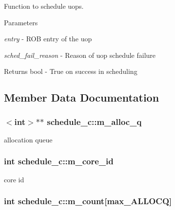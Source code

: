 Function to schedule uops. 


\begin{DoxyParams}{Parameters}
\item[{\em entry}]-\/ ROB entry of the uop \item[{\em sched\_\-fail\_\-reason}]-\/ Reason of uop schedule failure \end{DoxyParams}
\begin{DoxyReturn}{Returns}
bool -\/ True on success in scheduling 
\end{DoxyReturn}


\subsection{Member Data Documentation}
\hypertarget{classschedule__c_a54abfd4e67cf5e137e5f47ce52e8d903}{
\subsubsection[{m\_\-alloc\_\-q}]{$<$int$>$$\ast$$\ast$ {\bf schedule\_\-c::m\_\-alloc\_\-q}}}
\label{classschedule__c_a54abfd4e67cf5e137e5f47ce52e8d903}
allocation queue \hypertarget{classschedule__c_a6c4f8484b3f2dae8255c0ce064f9d46e}{
\subsubsection[{m\_\-core\_\-id}]{\setlength{\rightskip}{0pt plus 5cm}int {\bf schedule\_\-c::m\_\-core\_\-id}}}
\label{classschedule__c_a6c4f8484b3f2dae8255c0ce064f9d46e}
core id \hypertarget{classschedule__c_a0dc86a2612108d557b5d9b4147b93a84}{
\subsubsection[{m\_\-count}]{\setlength{\rightskip}{0pt plus 5cm}int {\bf schedule\_\-c::m\_\-count}\mbox{[}max\_\-ALLOCQ\mbox{]}}}
